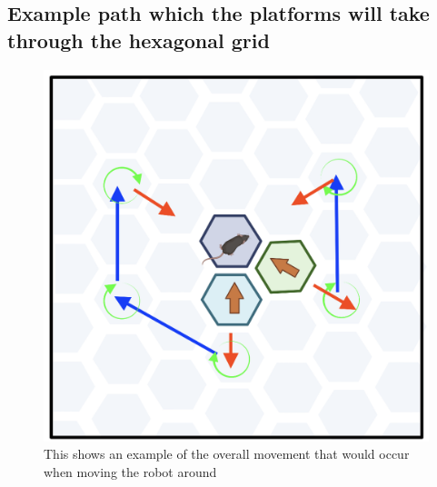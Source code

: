 \subsection{Example path which the platforms will take through the hexagonal grid}
\label{fig:example_path}
\begin{figure}[H]
    \centering
    \includegraphics[scale=0.4]{images/overview_of_algorithm.png}
    \caption{This shows an example of the overall movement that would occur when moving the robot around}
    \label{fig:overview_of_algorithm}
\end{figure}



